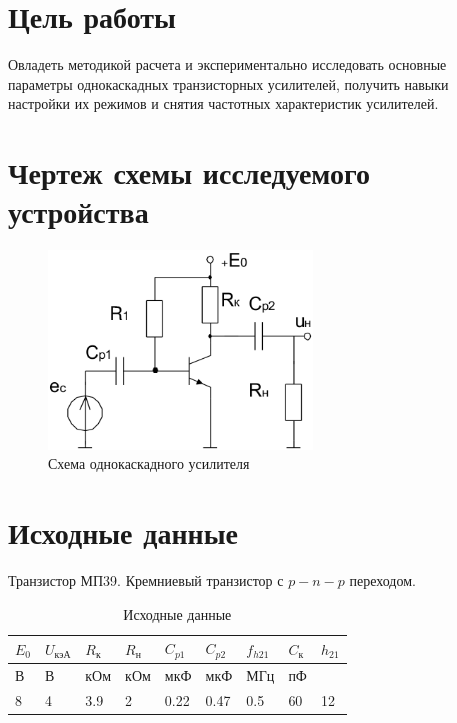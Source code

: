 





\section{Цель работы}

Овладеть методикой расчета и экспериментально исследовать основные параметры однокаскадных транзисторных усилителей, получить навыки настройки их режимов и снятия частотных характеристик усилителей.

\section{Чертеж схемы исследуемого устройства}

\begin{figure}[H]
	\begin{center}
	\vspace{-0.5cm}
		\includegraphics[width=7cm]{img/scheme}
		\caption{Схема однокаскадного усилителя}
		\label{figure:1}
	\vspace{-0.5cm}
	\end{center}
\end{figure}

\section{Исходные данные}

Транзистор МП39. Кремниевый транзистор с $p-n-p$ переходом.

\begin{table}[H]
	\begin{center}
	\caption{Исходные данные}
	\def\arraystretch{1.4}
		\begin{tabularx}{\textwidth}{|X|X|X|X|X|X|X|X|X|}
			\hline
			$E_0$ &
			$U_\text{кэА}$ &
			$R_\text{к}$ &
			$R_\text{н}$ &
			$C_{p1}$ &
			$C_{p2}$ &
			$f_{h21}$ &
			$C_\text{к}$ &
			$h_{21}$ \\
			\hline
			В &
			В &
			кОм &
			кОм &
			мкФ &
			мкФ &
			МГц &
			пФ &
			\\
			\hline
			8 &
			4 &
			3.9 &
			2 &
			0.22 &
			0.47 &
			0.5 &
			60 &
			12 \\
		    \hline	
		\end{tabularx}
		\label{tabular:1}
	\end{center}
\end{table}

